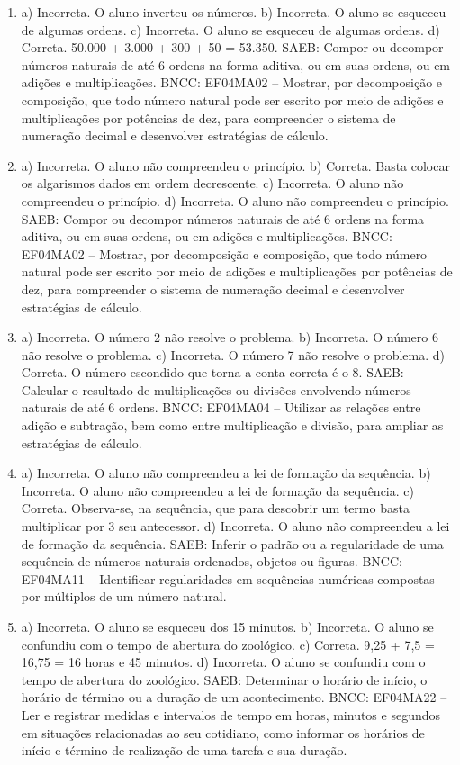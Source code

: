\begin{enumerate}
\item
a) Incorreta. O aluno inverteu os números.
b) Incorreta. O aluno se esqueceu de algumas ordens.
c) Incorreta. O aluno se esqueceu de algumas ordens.
d) Correta. 50.000 + 3.000 + 300 + 50 = 53.350.
SAEB: Compor ou decompor números naturais de até 6 ordens na
forma aditiva, ou em suas ordens, ou em adições e multiplicações.
BNCC: EF04MA02 -- Mostrar, por decomposição e composição, que todo número natural pode ser escrito
por meio de adições e multiplicações por potências de dez, para compreender o sistema de
numeração decimal e desenvolver estratégias de cálculo.

\item
a) Incorreta. O aluno não compreendeu o princípio.
b) Correta. Basta colocar os algarismos dados em ordem decrescente.
c) Incorreta. O aluno não compreendeu o princípio.
d) Incorreta. O aluno não compreendeu o princípio.
SAEB: Compor ou decompor números naturais de até 6 ordens na
forma aditiva, ou em suas ordens, ou em adições e multiplicações.
BNCC: EF04MA02 -- Mostrar, por decomposição e composição, que todo número natural pode ser escrito
por meio de adições e multiplicações por potências de dez, para compreender o sistema de
numeração decimal e desenvolver estratégias de cálculo.

\item
a) Incorreta. O número 2 não resolve o problema.
b) Incorreta. O número 6 não resolve o problema.
c) Incorreta. O número 7 não resolve o problema.
d) Correta. O número escondido que torna a conta correta é o 8.
SAEB: Calcular o resultado de multiplicações ou divisões
envolvendo números naturais de até 6 ordens.
BNCC: EF04MA04 -- Utilizar as relações entre adição e subtração, bem como entre multiplicação e divisão,
para ampliar as estratégias de cálculo.

\item
a) Incorreta. O aluno não compreendeu a lei de formação da sequência.
b) Incorreta. O aluno não compreendeu a lei de formação da sequência.
c) Correta. Observa-se, na sequência, que para descobrir um termo basta
multiplicar por 3 seu antecessor.
d) Incorreta. O aluno não compreendeu a lei de formação da sequência.
SAEB: Inferir o padrão ou a regularidade de uma sequência de
números naturais ordenados, objetos ou figuras.
BNCC: EF04MA11 -- Identificar regularidades em sequências numéricas compostas por múltiplos de um
número natural.

\item
a) Incorreta. O aluno se esqueceu dos 15 minutos.
b) Incorreta. O aluno se confundiu com o tempo de abertura do zoológico.
c) Correta. 9,25 + 7,5 = 16,75 = 16 horas e 45 minutos.
d) Incorreta. O aluno se confundiu com o tempo de abertura do zoológico.
SAEB: Determinar o horário de início, o horário de término ou
a duração de um acontecimento.
BNCC: EF04MA22 -- Ler e registrar medidas e intervalos de tempo em horas, minutos e segundos em
situações relacionadas ao seu cotidiano, como informar os horários de início e término de realização
de uma tarefa e sua duração.


\end{enumerate}

